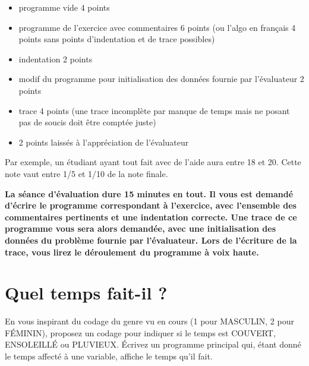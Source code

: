 \begin{correction}
    \begin{itemize}
    \item programme vide 4 points
    \item programme de l'exercice avec commentaires 6 points (ou l'algo en français 4 points sans points d'indentation et de trace possibles)
    \item indentation 2 points
    \item modif du programme pour initialisation des données fournie par l'évaluateur 2 points
    \item trace 4 points (une trace incomplète par manque de temps mais ne posant pas de soucis doit être comptée juste)
    \item 2 points laissés à l'appréciation de l'évaluateur
    \end{itemize}
    Par exemple, un étudiant ayant tout fait avec de l'aide aura entre 18 et 20. Cette note vaut entre 1/5 et 1/10 de la note finale.
\end{correction}

\newpage
\textbf{La séance d'évaluation dure 15 minutes en tout. Il vous est demandé d'écrire le programme correspondant à l'exercice, avec l'ensemble des commentaires pertinents et une indentation correcte. Une trace de ce programme vous sera alors demandée, avec une initialisation des données du problème fournie par l'évaluateur. Lors de l'écriture de la trace, vous lirez le déroulement du programme à voix haute.}

\section{Quel temps fait-il ?}

En vous inspirant du codage du genre vu en cours (1 pour MASCULIN, 2
pour FÉMININ), proposez un codage pour indiquer si le temps est
COUVERT, ENSOLEILLÉ ou PLUVIEUX.
Écrivez un programme principal qui, étant donné le temps affecté à une
variable, affiche le temps qu'il fait.

